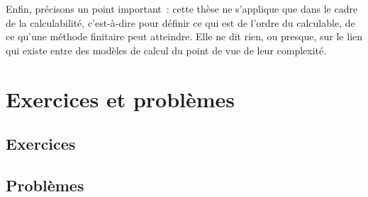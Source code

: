Enfin, précisons un point important~: cette thèse ne s'applique que dans le
cadre de la calculabilité, c'est-à-dire pour définir ce qui est de l'ordre du
calculable, de ce qu'une méthode finitaire peut atteindre. Elle ne dit rien,
ou presque, sur le lien qui existe entre des modèles de calcul du point de vue
de leur complexité.

\clearpage

\section{Exercices et problèmes}

\subsection{Exercices}

\clearpage

\subsection{Problèmes}
